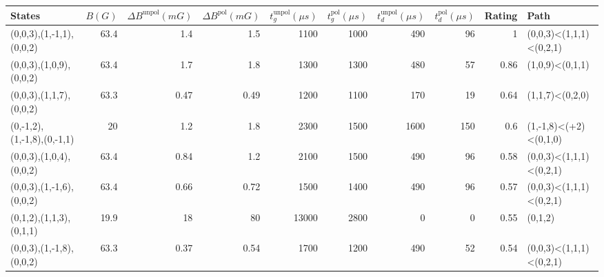 \begin{tabular}{lrrrrrrrrl}
\hline
 {States}                   &   {$B(G)$} &   {$\Delta B^{\text{unpol}}(mG)$} &   {$\Delta B^{\text{pol}}(mG)$} &   {$t^{\text{unpol}}_{g}(\mu s)$} &   {$t^{\text{pol}}_{g}(\mu s)$} &   {$t^{\text{unpol}}_{d}(\mu s)$} &   {$t^{\text{pol}}_{d}(\mu s)$} &   {Rating} & {Path}                  \\
\hline
 (0,0,3),(1,-1,1),(0,0,2)   &       63.4 &                              1.4  &                            1.5  &                              1100 &                            1000 &                               490 &                              96 &       1    & (0,0,3)<(1,1,1)<(0,2,1) \\
 (0,0,3),(1,0,9),(0,0,2)    &       63.4 &                              1.7  &                            1.8  &                              1300 &                            1300 &                               480 &                              57 &       0.86 & (1,0,9)<(0,1,1)         \\
 (0,0,3),(1,1,7),(0,0,2)    &       63.3 &                              0.47 &                            0.49 &                              1200 &                            1100 &                               170 &                              19 &       0.64 & (1,1,7)<(0,2,0)         \\
 (0,-1,2),(1,-1,8),(0,-1,1) &       20   &                              1.2  &                            1.8  &                              2300 &                            1500 &                              1600 &                             150 &       0.6  & (1,-1,8)<(+2)<(0,1,0)   \\
 (0,0,3),(1,0,4),(0,0,2)    &       63.4 &                              0.84 &                            1.2  &                              2100 &                            1500 &                               490 &                              96 &       0.58 & (0,0,3)<(1,1,1)<(0,2,1) \\
 (0,0,3),(1,-1,6),(0,0,2)   &       63.4 &                              0.66 &                            0.72 &                              1500 &                            1400 &                               490 &                              96 &       0.57 & (0,0,3)<(1,1,1)<(0,2,1) \\
 (0,1,2),(1,1,3),(0,1,1)    &       19.9 &                             18    &                           80    &                             13000 &                            2800 &                                 0 &                               0 &       0.55 & (0,1,2)                 \\
 (0,0,3),(1,-1,8),(0,0,2)   &       63.3 &                              0.37 &                            0.54 &                              1700 &                            1200 &                               490 &                              52 &       0.54 & (0,0,3)<(1,1,1)<(0,2,1) \\
\hline
\end{tabular}